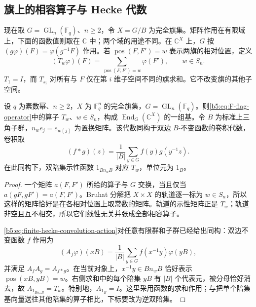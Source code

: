 \subsection{旗上的相容算子与 Hecke 代数}
\label{b5:subsec:F04:02}

现在取 \(G=\operatorname{GL}_n(\mathbb F_q)\)、\(n\ge2\)，令 \(X=G/B\) 为完全旗集。矩阵作用在有限域上，下面的函数值则取在 \(\mathbb C\) 中；两个域的用途不同。在 \(\mathbb C^X\) 上，\(G\) 按 \((g\varphi)(F)=\varphi(g^{-1}F)\) 作用。若 \(\operatorname{pos}(F,F')=w\) 表示两旗的相对位置，定义
\begin{equation}\label{b5:eq:F-flag-operator}
	(T_w\varphi)(F)=\sum_{\operatorname{pos}(F,F')=w}\varphi(F'),\qquad w\in S_n.
\end{equation}
\(T_1=I\)，而 \(T_{s_i}\) 对所有与 \(F\) 仅在第 \(i\) 维子空间不同的旗求和。它不改变旗的其他子空间。

\begin{proposition}\label{b5:prop:F-flag-commutant}
	设 \(q\) 为素数幂、\(n\ge2\)，\(X\) 为 \(\mathbb F_q^n\) 的完全旗集，\(G=\operatorname{GL}_n(\mathbb F_q)\)。则\eqref{b5:eq:F-flag-operator}中的算子 \(T_w\)、\(w\in S_n\)，构成 \(\operatorname{End}_G(\mathbb C^X)\) 的一组基。令 \(B\) 为标准上三角子群，\(n_w e_j=e_{w(j)}\) 为置换矩阵。该代数同构于双边 \(B\)-不变函数的卷积代数，卷积取
	\[
		(f*g)(z)=\frac1{|B|}\sum_{y\in G}f(y)g(y^{-1}z).
	\]
	在此同构下，双陪集示性函数 \(1_{Bn_wB}\) 对应 \(T_w\)，单位元为 \(1_B\)。
\end{proposition}
\begin{proof}
	一个矩阵 \(a(F,F')\) 所给的算子与 \(G\) 交换，当且仅当 \(a(gF,gF')=a(F,F')\)。Bruhat 分解把 \(X\times X\) 的轨道逐一标为 \(w\in S_n\)，所以这样的矩阵恰好是在各相对位置上取常数的矩阵。轨道的示性矩阵正是 \(T_w\)；轨道非空且互不相交，所以它们线性无关并张成全部相容算子。

	\eqref{b5:eq:finite-hecke-convolution-action}对任意有限群和子群已经给出同构：双边不变函数 \(f\) 作用为
	\[
		(A_f\varphi)(xB)=\frac1{|B|}\sum_{y\in G}f(x^{-1}y)\varphi(yB),
	\]
	并满足 \(A_fA_g=A_{f*g}\)。在当前对象上，\(x^{-1}y\in Bn_wB\) 恰好表示 \(\operatorname{pos}(xB,yB)=w\)。右侧求和中的每个陪集 \(yB\) 有 \(|B|\) 个代表元，被分母恰好消去，故 \(A_{1_{Bn_wB}}=T_w\)。特别地，\(A_{1_B}=I\)。这里采用函数的求和作用；与把单个陪集基向量送往其他陪集的算子相比，下标要改为逆双陪集。
\end{proof}

